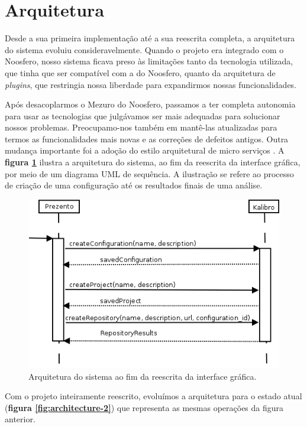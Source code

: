 \documentclass{llncs}
\begin{document}
\section{Arquitetura}
  Desde a sua primeira implementação até a sua reescrita completa, a arquitetura do sistema evoluiu consideravelmente. Quando o projeto era integrado com o Noosfero, nosso sistema ficava preso às limitações tanto da tecnologia utilizada, que tinha que ser compatível com a do Noosfero, quanto da arquitetura de \textit{plugins}, que restringia nossa liberdade para expandirmos nossas funcionalidades.

  Após desacoplarmos o Mezuro do Noosfero, passamos a ter completa autonomia para usar as tecnologias que julgávamos ser mais adequadas para solucionar nossos problemas. Preocupamo-nos também em mantê-las atualizadas para termos as funcionalidades mais novas e as correções de defeitos antigos. Outra mudança importante foi a adoção do estilo arquitetural de micro serviços \cite{namiot2014micro}. A \textbf{figura \ref{fig:architecture-1}} ilustra a arquitetura do sistema, ao fim da reescrita da interface gráfica, por meio de um diagrama UML de sequência. A ilustração se refere ao processo de criação de uma configuração até os resultados finais de uma análise.

  \begin{figure}[H]
    \centering
    \includegraphics[width=\textwidth]{images/prev_processing_seq_diag.png}
    \caption{Arquitetura do sistema ao fim da reescrita da interface gráfica.}
    \label{fig:architecture-1}
  \end{figure}

  Com o projeto inteiramente reescrito, evoluímos a arquitetura para o estado atual (\textbf{figura \ref{fig:architecture-2}}) que representa as mesmas operações da figura anterior.
\end{document}
